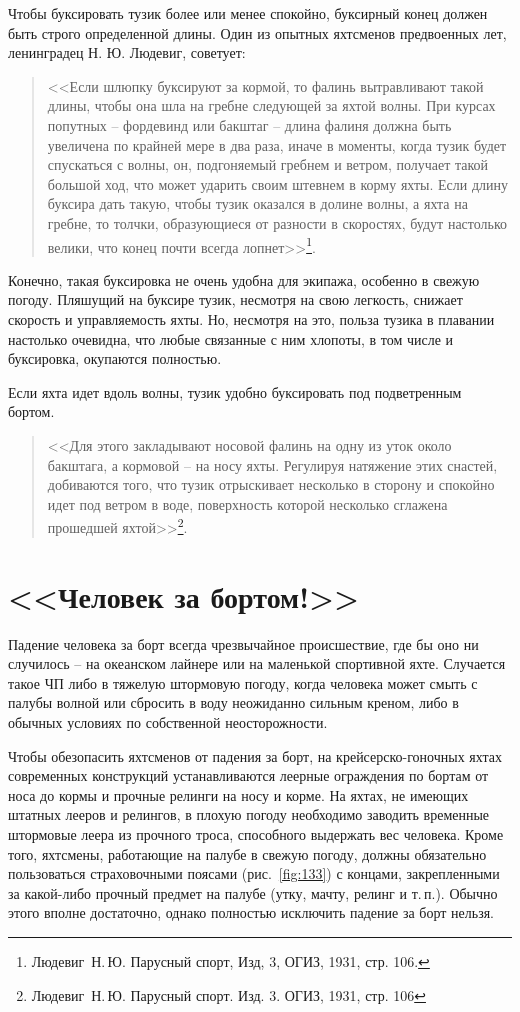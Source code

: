 \documentclass[a4paper, 12pt, twoside, final]{scrbook}
\begin{document}
Чтобы буксировать тузик более или менее спокойно, буксирный конец должен быть строго определенной длины. Один из опытных яхтсменов предвоенных лет, ленинградец Н. Ю. Людевиг, советует: 
\begin{quote}
<<Если шлюпку буксируют за кормой, то фалинь вытравливают такой длины, чтобы она шла на гребне следующей за яхтой волны. При курсах попутных \--- фордевинд или бакштаг \--- длина фалиня должна быть увеличена по крайней мере в два раза, иначе в моменты, когда тузик будет спускаться с волны, он, подгоняемый гребнем и ветром, получает такой большой ход, что может ударить своим штевнем в корму яхты. Если длину буксира дать такую, чтобы тузик оказался в долине волны, а яхта на гребне, то толчки, образующиеся от разности в скоростях, будут настолько велики, что конец почти всегда лопнет>>\footnote{Людевиг~Н.\,Ю. Парусный спорт, Изд, 3, ОГИЗ, 1931, стр. 106.}.
\end{quote}

Конечно, такая буксировка не очень удобна для экипажа, особенно в свежую погоду. Пляшущий на буксире тузик, несмотря на свою легкость, снижает скорость и управляемость яхты. Но, несмотря на это, польза тузика в плавании настолько очевидна, что любые связанные с ним хлопоты, в том числе и буксировка, окупаются полностью.

Если яхта идет вдоль волны, тузик удобно буксировать под подветренным бортом. 
\begin{quote}
<<Для этого закладывают носовой фалинь на одну из уток около бакштага, а кормовой \--- на носу яхты. Регулируя натяжение этих снастей, добиваются того, что тузик отрыскивает несколько в сторону и спокойно идет под ветром в воде, поверхность которой несколько сглажена прошедшей яхтой>>\footnote{Людевиг~Н.\,Ю. Парусный спорт. Изд. 3. ОГИЗ, 1931, стр. 106}.
\end{quote}

\section{<<Человек за бортом!>>}

Падение человека за борт всегда чрезвычайное происшествие, где бы оно ни случилось \--- на океанском лайнере или на маленькой спортивной яхте. Случается такое ЧП либо в тяжелую штормовую погоду, когда человека может смыть с палубы волной или сбросить в воду неожиданно сильным креном, либо в обычных условиях по собственной неосторожности.

Чтобы обезопасить яхтсменов от падения за борт, на крейсерско-гоночных яхтах современных конструкций устанавливаются леерные ограждения по бортам от носа до кормы и прочные релинги на носу и корме. На яхтах, не имеющих штатных лееров и релингов, в плохую погоду необходимо заводить временные штормовые леера из прочного троса, способного выдержать вес человека. Кроме того, яхтсмены, работающие на палубе в свежую погоду, должны обязательно пользоваться страховочными поясами (рис.~\ref{fig:133}) с концами, закрепленными за какой-либо прочный предмет на палубе (утку, мачту, релинг и т.\,п.). Обычно этого вполне достаточно, однако полностью исключить падение за борт нельзя.
\end{document}
